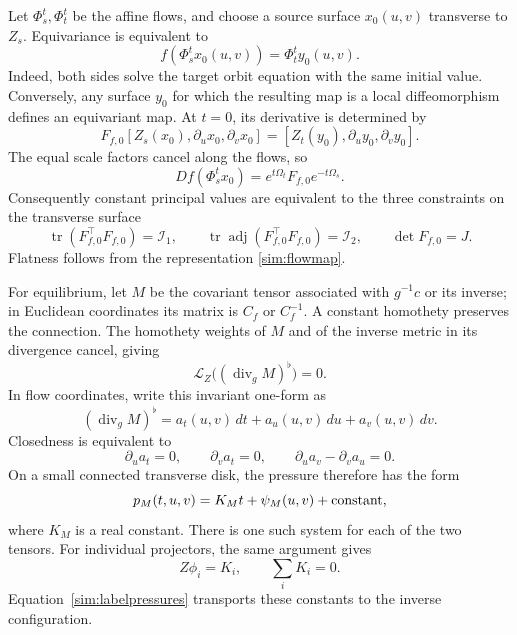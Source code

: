 \documentclass[11pt,a4paper]{article}
\numberwithin{equation}{section}
\theoremstyle{plain}
\theoremstyle{definition}
\theoremstyle{remark}
\begin{document}
Let $\Phi_s^t,\Phi_t^t$ be the affine flows, and choose a source
surface $x_0(u,v)$ transverse to $Z_s$. Equivariance is equivalent to
\begin{equation}\label{sim:flowmap}
f(\Phi_s^t x_0(u,v))=\Phi_t^t y_0(u,v).
\end{equation}
Indeed, both sides solve the target orbit equation with the same
initial value. Conversely, any surface $y_0$ for which the resulting
map is a local diffeomorphism defines an equivariant map.
At $t=0$, its derivative is determined by
\begin{equation}\label{sim:surfacegrad}
F_{f,0}[Z_s(x_0),\partial_ux_0,\partial_vx_0]
=[Z_t(y_0),\partial_uy_0,\partial_vy_0].
\end{equation}
The equal scale factors cancel along the flows, so
\begin{equation}\label{sim:gradientflow}
Df(\Phi_s^t x_0)=e^{t\Omega_t}F_{f,0}e^{-t\Omega_s}.
\end{equation}
Consequently constant principal values are equivalent to the
three constraints on the transverse surface
\begin{equation}\label{sim:surfaceinvariants}
\operatorname{tr}(F_{f,0}^{\top}F_{f,0})=\mathcal I_1,\qquad
\operatorname{tr}\operatorname{adj}(F_{f,0}^{\top}F_{f,0})=\mathcal I_2,
\qquad\det F_{f,0}=J.
\end{equation}
Flatness follows from the representation \eqref{sim:flowmap}.

For equilibrium, let $M$ be the covariant tensor associated with
$g^{-1}c$ or its inverse; in Euclidean coordinates its matrix is
$C_f$ or $C_f^{-1}$. A constant homothety preserves the connection.
The homothety weights of $M$ and of the inverse metric in its
divergence cancel, giving
\begin{equation}\label{sim:pressureinvariance}
\mathcal L_Z\bigl((\operatorname{div}_gM)^\flat\bigr)=0.
\end{equation}
In flow coordinates, write this invariant one-form as
\[
(\operatorname{div}_gM)^\flat
=a_t(u,v)\,dt+a_u(u,v)\,du+a_v(u,v)\,dv.
\]
Closedness is equivalent to
\begin{equation}\label{sim:pressurePDE}
\partial_ua_t=0,\qquad\partial_va_t=0,\qquad
\partial_ua_v-\partial_va_u=0.
\end{equation}
On a small connected transverse disk, the pressure therefore has
the form
\begin{equation}\label{sim:pressurepotentials}
p_M(t,u,v)=K_Mt+\psi_M(u,v)+\hbox{constant},
\end{equation}
where $K_M$ is a real constant. There is one such system for each
of the two tensors. For individual projectors, the same argument gives
\begin{equation}\label{sim:projectorpressureconstants}
Z\phi_i=K_i,\qquad\sum_iK_i=0.
\end{equation}
Equation~\eqref{sim:labelpressures} transports these constants to the
inverse configuration.
\end{document}
